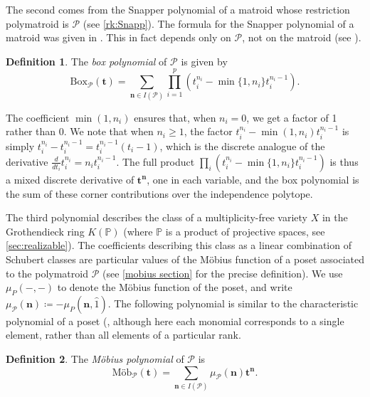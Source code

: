 \documentclass[a4paper, 11pt]{amsart}
\theoremstyle{definition}
\newtheorem{definition}[definition]{Definition}
\newcommand{\bfn}{\mathbf{n}}
\newcommand{\bft}{\mathbf{t}}
\newcommand{\sP}{\mathscr{P}}
\newcommand{\PP}{\mathbb{P}}
\DeclareMathOperator{\cave}{cave}
\begin{document}
The second comes from the Snapper polynomial of a matroid whose restriction polymatroid is $\sP$ (see \autoref{rk:Snapp}). 
The formula for the Snapper polynomial of a matroid was given in \cite[Corollary 7.5]{LLPP}. 
This in fact depends only on $\sP$, not on the matroid (see \cite[Corollary 2.9]{EL23}). 

\begin{definition}\label{def:box}
    The \textit{box polynomial} of $\sP$ is given by 
    \[\textrm{Box}_{\sP}(\bft) = \sum_{\bfn \in I(\sP)}\prod_{i=1}^p (t_i^{n_i}-\min\{1, n_i\}t_i^{n_i-1}).\]
\end{definition}
The coefficient $\min(1, n_i)$ ensures that, when $n_i=0$, we get a factor of 1 rather than 0. We note that when $n_i \ge 1$, the factor $t_i^{n_i} - \min(1, n_i)t_i^{n_i-1}$  is simply $t_i^{n_i} - t_i^{n_i-1} = t_i^{n_i-1}(t_i-1)$, which is the discrete analogue of the derivative $\frac{d}{dt_i}t_i^{n_i} = n_it_i^{n_i-1}$. The full product $\prod_i (t_i^{n_i}-\min\{1,n_i\}t_i^{n_i-1})$ is thus a mixed discrete derivative of $\mathbf{t}^{\mathbf{n}}$, one in each variable, and the box polynomial is the sum of these corner contributions over the independence polytope.


 
The third polynomial describes the class of a multiplicity-free variety $X$ in the Grothendieck ring $K(\PP)$ (where $\PP$ is a product of projective spaces, see \autoref{sec:realizable}). The coefficients describing this class as a linear combination of Schubert classes are particular values of the M\"obius function of a poset associated to the polymatroid $\sP$ (see \autoref{mobius section} for the precise definition). We use $\mu_P(-,-)$ to denote the M\"obius function of the poset, and write $\mu_\sP(\bfn) \coloneqq -\mu_P(\bfn, \hat{1})$. The following polynomial is similar to the characteristic polynomial of a poset (\cite[Section 3.10]{EC1}, although here each monomial corresponds to a single element, rather than all elements of a particular rank.

\begin{definition}
    The \textit{M\"obius polynomial} of $\sP$ is 
    \[\textrm{M\"ob}_{\sP}(\bft) = \sum_{\bfn\in I(\sP)} \mu_\sP(\bfn)\bft^\bfn.\]
\end{definition}
\end{document}
